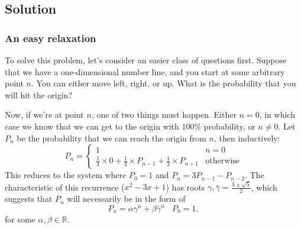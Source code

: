 \subsection*{Solution}

\subsubsection*{An easy relaxation}

To solve this problem, let's consider an easier class of questions first. Suppose that we have a one-dimensional number line, and you start at some arbitrary point $n$. You can either move left, right, or up. What is the probability that you will hit the origin?

Now, if we're at point $n$, one of two things must happen. Either $n = 0$, in which case we know that we can get to the origin with $100\%$ probability, or $n \ne 0$. Let $P_n$ be the probability that we can reach the origin from $n$, then inductively:
$$
P_n = \begin{cases}
1 & n = 0 \\
\frac13 \times 0 + \frac13 \times P_{n-1} + \frac13 \times P_{n+1} & \text{otherwise}
\end{cases}
$$
This reduces to the system where $P_0 = 1$ and $P_n = 3P_{n-1} - P_{n-2}$. The characteristic of this recurrence ($x^2 - 3x + 1$) has roots $\gamma,\bar\gamma = \frac{3 \pm \sqrt5}{2}$, which suggests that $P_n$ will necessarily be in the form of
$$
P_n = \alpha \gamma^n + \beta \bar\gamma^n ~~~~ P_0 = 1,
$$
for some $\alpha, \beta \in \mathbb{R}$.